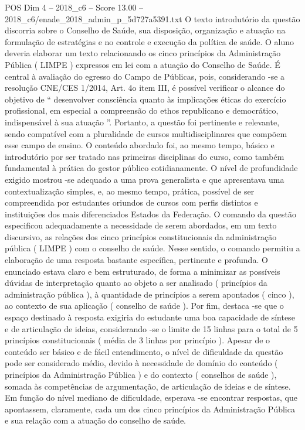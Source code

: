 \begin{textsample}{POS Dim 4 – 2018\_c6 – Score 13.00 – 2018\_c6/enade\_2018\_admin\_p\_5d727a5391.txt}
O texto introdutório da questão discorria sobre o Conselho de Saúde, sua disposição, organização e atuação na formulação de estratégias e no controle e execução da política de saúde.
O aluno deveria elaborar um texto relacionando os cinco princípios da Administração Pública ( LIMPE ) expressos em lei com a atuação do Conselho de Saúde.
É central à avaliação do egresso do Campo de Públicas, pois, considerando -se a resolução CNE/CES 1/2014, Art. 4o item III, é possível verificar o alcance do objetivo de “ desenvolver consciência quanto às implicações éticas do exercício profissional, em especial a compreensão do ethos republicano e democrático, indispensável à sua atuação ”.
Portanto, a questão foi pertinente e relevante, sendo compatível com a pluralidade de cursos multidisciplinares que compõem esse campo de ensino.
O conteúdo abordado foi, ao mesmo tempo, básico e introdutório por ser tratado nas primeiras disciplinas do curso, como também fundamental à prática do gestor público cotidianamente.
O nível de profundidade exigido mostrou -se adequado a uma prova generalista e que apresentava uma contextualização simples, e, ao mesmo tempo, prática, possível de ser compreendida por estudantes oriundos de cursos com perfis distintos e instituições dos mais diferenciados Estados da Federação.
O comando da questão especificou adequadamente a necessidade de serem abordados, em um texto discursivo, as relações dos cinco princípios constitucionais da administração pública ( LIMPE ) com o conselho de saúde.
Nesse sentido, o comando permitiu a elaboração de uma resposta bastante específica, pertinente e profunda.
O enunciado estava claro e bem estruturado, de forma a minimizar as possíveis dúvidas de interpretação quanto ao objeto a ser analisado ( princípios da administração pública ), à quantidade de princípios a serem apontados ( cinco ), ao contexto de sua aplicação ( conselho de saúde ).
Por fim, destaca -se que o espaço destinado à resposta exigiria do estudante uma boa capacidade de síntese e de articulação de ideias, considerando -se o limite de 15 linhas para o total de 5 princípios constitucionais ( média de 3 linhas por princípio ).
Apesar de o conteúdo ser básico e de fácil entendimento, o nível de dificuldade da questão pode ser considerado médio, devido à necessidade de domínio do conteúdo ( princípios da Administração Pública ) e do contexto ( conselhos de saúde ), somada às competências de argumentação, de articulação de ideias e de síntese.
Em função do nível mediano de dificuldade, esperava -se encontrar respostas, que apontassem, claramente, cada um dos cinco princípios da Administração Pública e sua relação com a atuação do conselho de saúde.

\end{textsample}
